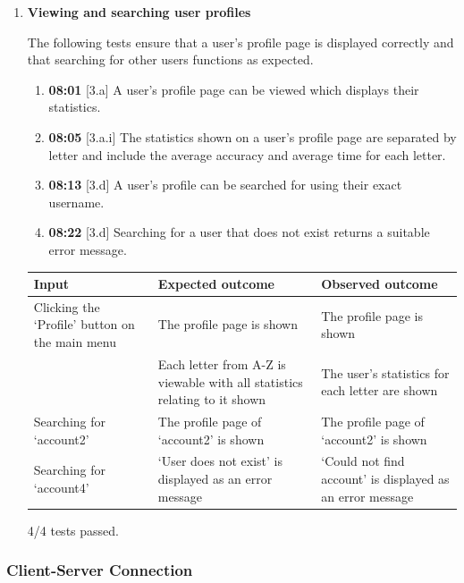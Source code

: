 \documentclass{article}
\begin{document}
\begin{enumerate}
    \item \textbf{Viewing and searching user profiles}
    
    The following tests ensure that a user's profile page is displayed correctly and that searching for other users functions as expected.

    \begin{enumerate}
        \item \textbf{08:01} [3.a] A user's profile page can be viewed which displays their statistics.
        \item \textbf{08:05} [3.a.i] The statistics shown on a user's profile page are separated by letter and include the average accuracy and average time for each letter.
        \item \textbf{08:13} [3.d] A user's profile can be searched for using their exact username.
        \item \textbf{08:22} [3.d] Searching for a user that does not exist returns a suitable error message.
    \end{enumerate}

    \begin{table}[H]
    \centering
        \begin{tabularx}{\textwidth}{|L|L|L|}
        \hline
        \textbf{Input} & \textbf{Expected outcome} & \textbf{Observed outcome} \\\hline
        Clicking the `Profile' button on the main menu & The profile page is shown & The profile page is shown \\
         & Each letter from A-Z is viewable with all statistics relating to it shown & The user's statistics for each letter are shown \\\hline
        Searching for `account2' & The profile page of `account2' is shown & The profile page of `account2' is shown \\\hline
        Searching for `account4' & `User does not exist' is displayed as an error message & `Could not find account' is displayed as an error message \\\hline
        \end{tabularx}
    \end{table}

    4/4 tests passed. \\
    
\end{enumerate}

\subsubsection{Client-Server Connection}
\end{document}
